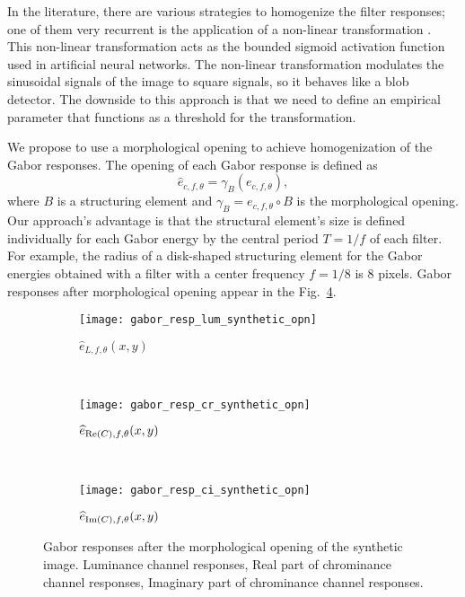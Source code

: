 In the literature, there are various strategies to homogenize the filter responses; one of them very recurrent is the application of a non-linear transformation \citep{Jain.Farrokhnia:IJPR:1991}. This non-linear transformation acts as the bounded sigmoid activation function used in artificial neural networks. The non-linear transformation modulates the sinusoidal signals of the image to square signals, so it behaves like a blob detector. The downside to this approach is that we need to define an empirical parameter that functions as a threshold for the transformation.

We propose to use a morphological opening to achieve homogenization of the Gabor responses. The opening of each Gabor response is defined as
\begin{equation}\label{eq:gabor_energy_opn}
	\widehat{e}_{c, f, \theta} = \gamma_B(e_{c, f, \theta}), 
\end{equation}
where $B$ is a structuring element and $\gamma_B = e_{c, f, \theta} \circ B$ is the morphological opening. Our approach's advantage is that the structural element's size is defined individually for each Gabor energy by the central period $ T=1 / f $ of each filter. For example, the radius of a disk-shaped structuring element for the Gabor energies obtained with a filter with a center frequency $ f = 1/8 $ is 8 pixels. Gabor responses after morphological opening appear in the Fig.\ \ref{fig:synthetic_img_gresponses_opn}.
\begin{figure}[!ht]
    \centering
    \begin{subfigure}[b]{\textwidth}   
        \texttt{[image: gabor\_resp\_lum\_synthetic\_opn]}
        \caption{$\widehat{e}_{L, f, \theta}(x,y)$} 
        \label{fig:lum_gabor_energies_opn}
    \end{subfigure} \\ [2ex]   
    \begin{subfigure}[b]{\textwidth}   
    	\texttt{[image: gabor\_resp\_cr\_synthetic\_opn]}
    	\caption{$\widehat{e}_{\mathrm{Re}(C), f, \theta}(x,y)$}
        \label{fig:cr_gabor_energies_opn}
    \end{subfigure} \\ [2ex]    	
    \begin{subfigure}[b]{\textwidth}  
        \texttt{[image: gabor\_resp\_ci\_synthetic\_opn]}
        \caption{$\widehat{e}_{\mathrm{Im}(C), f, \theta}(x,y)$}
        \label{fig:ci_gabor_energies_opn} 
    \end{subfigure} 
    	    
    \caption{Gabor responses after the morphological opening of the synthetic image.  Luminance channel responses,  Real part of chrominance channel responses,  Imaginary part of chrominance channel responses.}\label{fig:synthetic_img_gresponses_opn}    
\end{figure}

